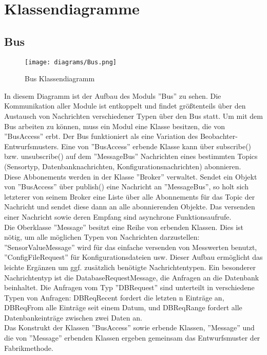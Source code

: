 \documentclass[entwurf.tex]{subfiles}
\begin{document}
\chapter{Klassendiagramme}
	\section{Bus}
		\begin{figure}[h!]
  			\begin{center}
 				\texttt{[image: diagrams/Bus.png]}
  				\caption{Bus Klassendiagramm}
  			\end{center}
  		\end{figure}
  		In diesem Diagramm ist der Aufbau des Moduls ''Bus'' zu sehen. Die Kommunikation aller Module ist entkoppelt und findet größtenteils über den Austausch von Nachrichten verschiedener Typen über den Bus statt. Um mit dem Bus arbeiten zu können, muss ein Modul eine Klasse besitzen, die von ''BusAccess'' erbt. Der Bus funktioniert als eine Variation des Beobachter-Entwurfsmusters. Eine von ''BusAccess'' erbende Klasse kann über subscribe() bzw. unsubscribe() auf dem ''MessageBus'' Nachrichten eines bestimmten Topics (Sensortyp, Datenbanknachrichten, Konfigurationsnachrichten) abonnieren. \\
  		Diese Abbonements werden in der Klasse ''Broker'' verwaltet. Sendet ein Objekt von ''BusAccess'' über publish() eine Nachricht an ''MessageBus'', so holt sich letzterer von seinem Broker eine Liste über alle Abonnements für das Topic der Nachricht und sendet diese dann an alle abonnierenden Objekte. Das versenden einer Nachricht sowie deren Empfang sind asynchrone Funktionsaufrufe. \\
  		Die Oberklasse ''Message'' besitzt eine Reihe von erbenden Klassen. Dies ist nötig, um alle möglichen Typen von Nachrichten darzustellen: ''SensorValueMessage'' wird für das einfache versenden von Messwerten benutzt, ''ConfigFileRequest'' für Konfigurationsdateien usw. Dieser Aufbau ermöglicht das leichte Ergänzen um ggf. zusätzlich benötigte Nachrichtentypen. Ein besonderer Nachrichtentyp ist die DatabaseRequestMessage, die Anfragen an die Datenbank beinhaltet. Die Anfragen vom Typ ''DBRequest'' sind unterteilt in verschiedene Typen von Anfragen: DBReqRecent fordert die letzten n Einträge an, DBReqFrom alle Einträge seit einem Datum, und DBReqRange fordert alle Datenbankeinträge zwischen zwei Daten an. \\
  		Das Konstrukt  der Klassen ''BusAccess'' sowie erbende Klassen, ''Message'' und die von ''Message'' erbenden Klassen ergeben gemeinsam das Entwurfsmuster der Fabrikmethode. 
  		
\end{document}
